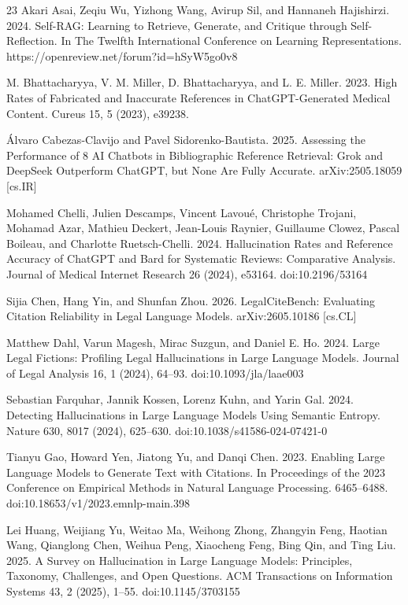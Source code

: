\begin{thebibliography}{23}
 Akari Asai, Zeqiu Wu, Yizhong Wang, Avirup Sil, and Hannaneh Hajishirzi. 2024. Self-RAG: Learning to Retrieve, Generate, and Critique through Self-Reflection. In The Twelfth International Conference on Learning Representations. https://openreview.net/forum?id=hSyW5go0v8

 M. Bhattacharyya, V. M. Miller, D. Bhattacharyya, and L. E. Miller. 2023. High Rates of Fabricated and Inaccurate References in ChatGPT-Generated Medical Content. Cureus 15, 5 (2023), e39238.

 Álvaro Cabezas-Clavijo and Pavel Sidorenko-Bautista. 2025. Assessing the Performance of 8 AI Chatbots in Bibliographic Reference Retrieval: Grok and DeepSeek Outperform ChatGPT, but None Are Fully Accurate. arXiv:2505.18059 [cs.IR]

 Mohamed Chelli, Julien Descamps, Vincent Lavoué, Christophe Trojani, Mohamad Azar, Mathieu Deckert, Jean-Louis Raynier, Guillaume Clowez, Pascal Boileau, and Charlotte Ruetsch-Chelli. 2024. Hallucination Rates and Reference Accuracy of ChatGPT and Bard for Systematic Reviews: Comparative Analysis. Journal of Medical Internet Research 26 (2024), e53164. doi:10.2196/53164

 Sijia Chen, Hang Yin, and Shunfan Zhou. 2026. LegalCiteBench: Evaluating Citation Reliability in Legal Language Models. arXiv:2605.10186 [cs.CL]

 Matthew Dahl, Varun Magesh, Mirac Suzgun, and Daniel E. Ho. 2024. Large Legal Fictions: Profiling Legal Hallucinations in Large Language Models. Journal of Legal Analysis 16, 1 (2024), 64–93. doi:10.1093/jla/laae003

 Sebastian Farquhar, Jannik Kossen, Lorenz Kuhn, and Yarin Gal. 2024. Detecting Hallucinations in Large Language Models Using Semantic Entropy. Nature 630, 8017 (2024), 625–630. doi:10.1038/s41586-024-07421-0

 Tianyu Gao, Howard Yen, Jiatong Yu, and Danqi Chen. 2023. Enabling Large Language Models to Generate Text with Citations. In Proceedings of the 2023 Conference on Empirical Methods in Natural Language Processing. 6465–6488. doi:10.18653/v1/2023.emnlp-main.398

 Lei Huang, Weijiang Yu, Weitao Ma, Weihong Zhong, Zhangyin Feng, Haotian Wang, Qianglong Chen, Weihua Peng, Xiaocheng Feng, Bing Qin, and Ting Liu. 2025. A Survey on Hallucination in Large Language Models: Principles, Taxonomy, Challenges, and Open Questions. ACM Transactions on Information Systems 43, 2 (2025), 1–55. doi:10.1145/3703155


\end{thebibliography}
